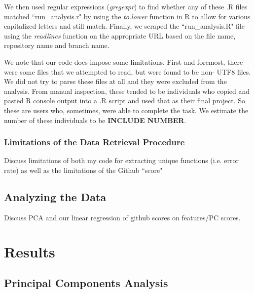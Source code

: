 \documentclass[12pt]{article}\usepackage[]{graphicx}\usepackage[]{color}
\begin{document}
We then used regular expressions ({\it gregexpr}) to find whether 
any of these .R files matched ``run\_analysis.r" by using the {\it to.lower}
function in R to allow for various capitalized letters and 
still match. Finally, we scraped the ``run\_analysis.R" file using the {\it readlines} 
function on the appropriate URL based on the file name, repository name 
and branch name.

We note that our code does impose some limitations. First and foremost, there were some files that we attempted to read, but 
were found to be non- UTF8 files. We did not try to parse these files at all and they were excluded from the analysis. 
From manual inspection, these tended to be individuals who copied and pasted R console output into a .R script and used that as 
their final project. So these are users who, sometimes, were able to complete the task. 
We estimate the number of these individuals to be \textbf{INCLUDE NUMBER}.


\subsubsection{Limitations of the Data Retrieval Procedure}

Discuss limitations of both my code for extracting unique functions (i.e. error rate) as well as the limitations of the Github ``score"

\subsection{Analyzing the Data}

Discuss PCA and our linear regression of github scores on features/PC scores.






\section{Results}
\label{results}



\subsection{Principal Components Analysis}
\end{document}
